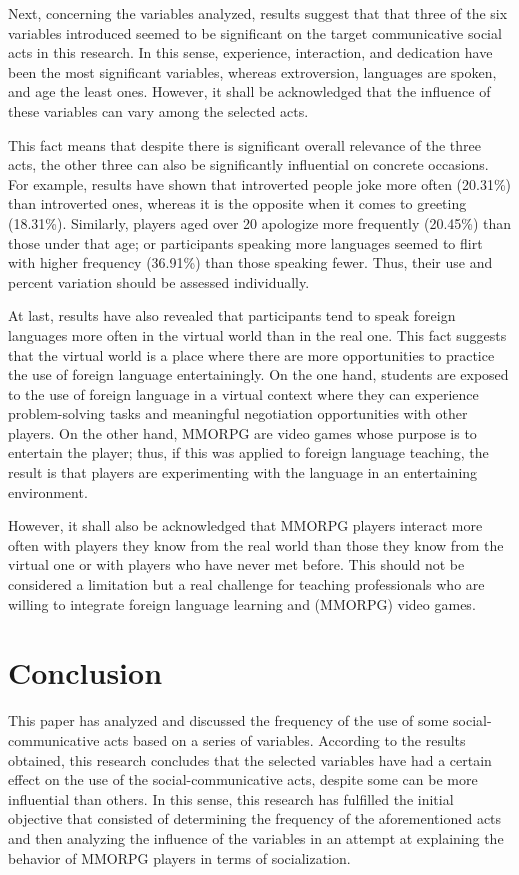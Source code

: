 \documentclass[english]{textolivre}
\begin{document}
Next, concerning the variables analyzed, results suggest that that three of the six variables introduced seemed to be significant on the target communicative social acts in this research. In this sense, experience, interaction, and dedication have been the most significant variables, whereas extroversion, languages are spoken, and age the least ones. However, it shall be acknowledged that the influence of these variables can vary among the selected acts. 

This fact means that despite there is significant overall relevance of the three acts, the other three can also be significantly influential on concrete occasions. For example, results have shown that introverted people joke more often (20.31\%) than introverted ones, whereas it is the opposite when it comes to greeting (18.31\%). Similarly, players aged over 20 apologize more frequently (20.45\%) than those under that age; or participants speaking more languages seemed to flirt with higher frequency (36.91\%) than those speaking fewer. Thus, their use and percent variation should be assessed individually.

At last, results have also revealed that participants tend to speak foreign languages more often in the virtual world than in the real one. This fact suggests that the virtual world is a place where there are more opportunities to practice the use of foreign language entertainingly. On the one hand, students are exposed to the use of foreign language in a virtual context where they can experience problem-solving tasks and meaningful negotiation opportunities with other players. On the other hand, MMORPG are video games whose purpose is to entertain the player; thus, if this was applied to foreign language teaching, the result is that players are experimenting with the language in an entertaining environment. 

However, it shall also be acknowledged that MMORPG players interact more often with players they know from the real world than those they know from the virtual one or with players who have never met before. This should not be considered a limitation but a real challenge for teaching professionals who are willing to integrate foreign language learning and (MMORPG) video games. 

\section{Conclusion}
This paper has analyzed and discussed the frequency of the use of some social-communicative acts based on a series of variables. According to the results obtained, this research concludes that the selected variables have had a certain effect on the use of the social-communicative acts, despite some can be more influential than others. In this sense, this research has fulfilled the initial objective that consisted of determining the frequency of the aforementioned acts and then analyzing the influence of the variables in an attempt at explaining the behavior of MMORPG players in terms of socialization. 
\end{document}
